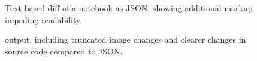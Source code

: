 \documentclass{deliverablereport}
\begin{document}
\begin{figure}
    \center
    \caption{Text-based diff of a notebook as JSON, showing additional markup impeding readability.}
    \label{fig:json-diff}
\end{figure}

\begin{figure}
    \center
    \caption{\nbdiff output, including truncated image changes and clearer changes in source code compared to JSON.}
    \label{fig:nbdiff}
\end{figure}
\end{document}
